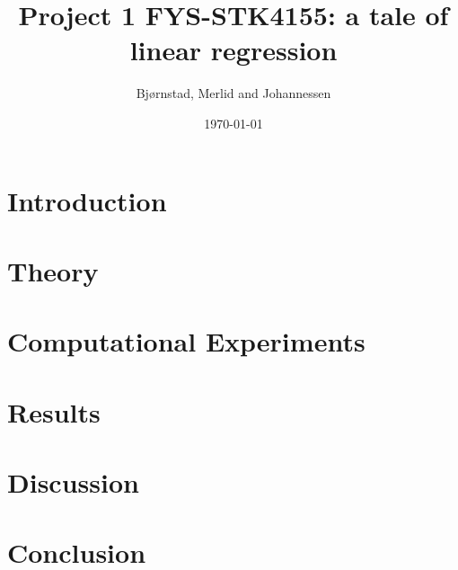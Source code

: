\documentclass[aps,rmp,reprint,amsmath,amssymb,longbibliography,twocolumn,floatfix]{revtex4-1}
\begin{document}
\title{Project 1 FYS-STK4155: a tale of linear regression}

\author{Bjørnstad, Merlid and Johannessen}
\date{\today}


\begin{abstract}

\end{abstract}
\maketitle

\tableofcontents

\section{Introduction}
\label{sec:introduction}

\section{Theory}


\section{Computational Experiments}


\section{Results}


\section{Discussion}


\section{Conclusion}


\newpage

\appendix
\label{appendix}

\end{document}
